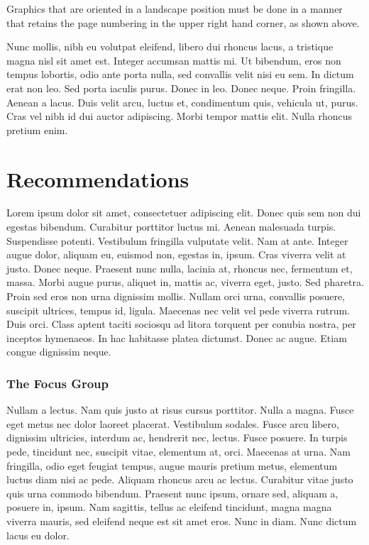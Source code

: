 
Graphics that are oriented in a landscape position must be done in a manner that retains the page numbering in the upper right hand corner, as shown above.  

Nunc mollis, nibh eu volutpat eleifend, libero dui rhoncus lacus, a tristique magna nisl sit amet est. Integer accumsan mattis mi. Ut bibendum, eros non tempus lobortis, odio ante porta nulla, sed convallis velit nisi eu sem. In dictum erat non leo. Sed porta iaculis purus. Donec in leo. Donec neque. Proin fringilla. Aenean a lacus. Duis velit arcu, luctus et, condimentum quis, vehicula ut, purus. Cras vel nibh id dui auctor adipiscing. Morbi tempor mattis elit. Nulla rhoncus pretium enim.


\chapter{Recommendations}

Lorem ipsum dolor sit amet, consectetuer adipiscing elit. Donec quis sem non dui egestas bibendum. Curabitur porttitor luctus mi. Aenean malesuada turpis. Suspendisse potenti. Vestibulum fringilla vulputate velit. Nam at ante. Integer augue dolor, aliquam eu, euismod non, egestas in, ipsum. Cras viverra velit at justo. Donec neque. Praesent nunc nulla, lacinia at, rhoncus nec, fermentum et, massa. Morbi augue purus, aliquet in, mattis ac, viverra eget, justo. Sed pharetra. Proin sed eros non urna dignissim mollis. Nullam orci urna, convallis posuere, suscipit ultrices, tempus id, ligula. Maecenas nec velit vel pede viverra rutrum. Duis orci. Class aptent taciti sociosqu ad litora torquent per conubia nostra, per inceptos hymenaeos. In hac habitasse platea dictumst. Donec ac augue. Etiam congue dignissim neque.

\subsection{The Focus Group}    

Nullam a lectus. Nam quis justo at risus cursus porttitor. Nulla a magna. Fusce eget metus nec dolor laoreet placerat. Vestibulum sodales. Fusce arcu libero, dignissim ultricies, interdum ac, hendrerit nec, lectus. Fusce posuere. In turpis pede, tincidunt nec, suscipit vitae, elementum at, orci. Maecenas at urna. Nam fringilla, odio eget feugiat tempus, augue mauris pretium metus, elementum luctus diam nisi ac pede. Aliquam rhoncus arcu ac lectus. Curabitur vitae justo quis urna commodo bibendum. Praesent nunc ipsum, ornare sed, aliquam a, posuere in, ipsum. Nam sagittis, tellus ac eleifend tincidunt, magna magna viverra mauris, sed eleifend neque est sit amet eros. Nunc in diam. Nunc dictum lacus eu dolor.

